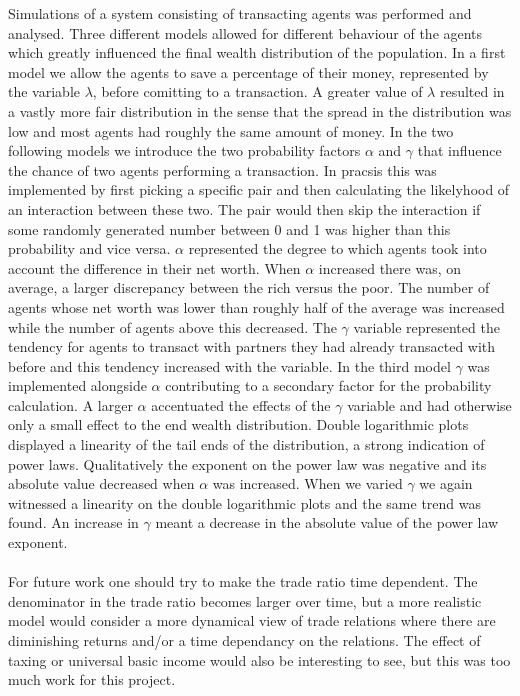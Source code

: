 Simulations of a system consisting of transacting agents was performed and analysed. Three different models allowed for different behaviour of the agents which greatly influenced the final wealth distribution of the population. In a first model we allow the agents to save a percentage of their money, represented by the variable $\lambda$, before comitting to a transaction. A greater value of $\lambda$ resulted in a vastly more fair distribution in the sense that the spread in the distribution was low and most agents had roughly the same amount of money. In the two following models we introduce the two probability factors $\alpha$ and $\gamma$ that influence the chance of two agents performing a transaction. In pracsis this was implemented by first picking a specific pair and then calculating the likelyhood of an interaction between these two. The pair would then skip the interaction if some randomly generated number between 0 and 1 was higher than this probability and vice versa. $\alpha$ represented the degree to which agents took into account the difference in their net worth. When $\alpha$ increased there was, on average, a larger discrepancy between the rich versus the poor. The number of agents whose net worth was lower than roughly half of the average was increased while the number of agents  above this decreased. The $\gamma$ variable represented the tendency for agents to transact with partners they had already transacted with before and this tendency increased with the variable. In the third model $\gamma$ was implemented alongside $\alpha$ contributing to a secondary factor for the probability calculation. A larger $\alpha$ accentuated the effects of the $\gamma$ variable and had otherwise only a small effect to the end wealth distribution. Double logarithmic plots displayed a linearity of the tail ends of the distribution, a strong indication of power laws. Qualitatively the exponent on the power law was negative and its absolute value decreased when $\alpha$ was increased. When we varied $\gamma$ we again witnessed a linearity on the double logarithmic plots and the same trend was found. An increase in $\gamma$ meant a decrease in the absolute value of the power law exponent. 
\\\\
For future work one should try to make the trade ratio time dependent. The denominator in the trade ratio becomes larger over time, but a more realistic model would consider a more dynamical view of trade relations where there are diminishing returns and/or a time dependancy on the relations. The effect of taxing or universal basic income would also be interesting to see, but this was too much work for this project. 